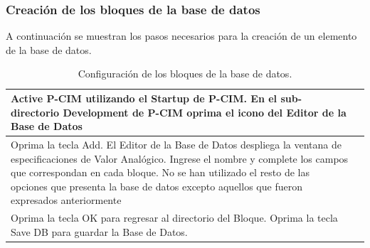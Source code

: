 \subsubsection{Creación de los bloques de la base de datos}
A continuación se muestran los pasos necesarios para la creación de un elemento de la base de datos.
\begin{table}[H]
\centering
\renewcommand*{\arraystretch}{0.01}
\begin{tabular}{*{2}{m{}}}
\hline
  Active P-CIM utilizando el Startup de P-CIM. En el sub-directorio Development 
  de P-CIM oprima el icono del Editor de la Base de Datos
  &\begin{center}
    \rule{0.4\textwidth}{0.3\textwidth}
  \end{center}\\
\hline
  Oprima la tecla Add. El Editor de la Base de Datos despliega la ventana de
  especificaciones de Valor Analógico. Ingrese el nombre y complete los campos 
  que correspondan en cada bloque. No se han utilizado el resto de las opciones 
  que presenta la base de datos excepto aquellos que fueron expresados 
  anteriormente 
  &\begin{center}
    \rule{0.4\textwidth}{0.3\textwidth}
  \end{center}\\
\hline
    Oprima la tecla OK para regresar al directorio del Bloque.
    Oprima la tecla Save DB para guardar la Base de Datos.
  &\begin{center}
    \rule{0.4\textwidth}{0.3\textwidth}
  \end{center}\\
\hline
\end{tabular}
\label{tab:confBlockDB}
\caption{Configuración de los bloques de la base de datos.}
\end{table}



